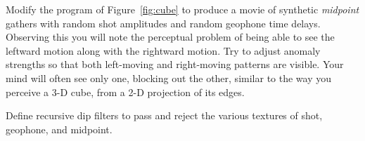 \begin{exer}
\item
Modify the program of Figure~\ref{fig:cube} to produce a movie
of synthetic %
{\em midpoint %
} gathers
with random shot amplitudes and random geophone time delays.
Observing this  you will note the perceptual problem of being
able to see the leftward motion along with the rightward motion.
Try to adjust anomaly strengths so that both left-moving
and right-moving patterns are visible.
Your mind will often see only one,
blocking out the other,
similar to the way you perceive a 3-D cube,
from a 2-D projection of its edges.
\item
Define recursive dip filters to pass and reject the
various textures of shot, geophone, and midpoint.
\end{exer}
















